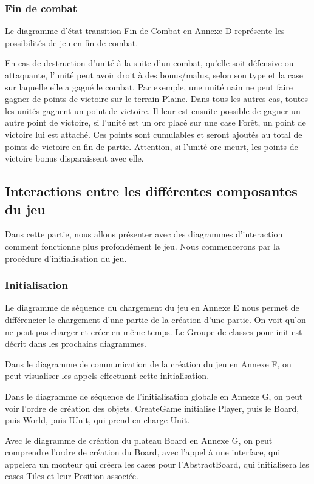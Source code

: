 \subsubsection{Fin de combat}

Le diagramme d'état transition Fin de Combat en Annexe D représente les possibilités de jeu en fin de combat. 

En cas de destruction d'unité à la suite d'un combat, qu'elle soit défensive ou attaquante, l'unité peut avoir droit à des bonus/malus, selon son type et la case sur laquelle elle a gagné le combat. Par exemple, une unité nain ne peut faire gagner de points de victoire sur le terrain Plaine. Dans tous les autres cas, toutes les unités gagnent un point de victoire. Il leur est ensuite possible de gagner un autre point de victoire, si l'unité est un orc placé sur une case Forêt, un point de victoire lui est attaché. Ces points sont cumulables et seront ajoutés au total de points de victoire en fin de partie. Attention, si l'unité orc meurt, les points de victoire bonus disparaissent avec elle.

\subsection{Interactions entre les différentes composantes du jeu}

Dans cette partie, nous allons présenter avec des diagrammes d'interaction comment fonctionne plus profondément le jeu. Nous commencerons par la procédure d'initialisation du jeu.
\subsubsection{Initialisation}

Le diagramme de séquence du chargement du jeu en Annexe E nous permet de différencier le chargement d'une partie de la création d'une partie. On voit qu'on ne peut pas charger et créer en même temps. Le Groupe de classes pour init est décrit dans les prochains diagrammes.

Dans le diagramme de communication de la création du jeu en Annexe F, on peut visualiser les appels effectuant cette initialisation.

Dans le diagramme de séquence de l'initialisation globale en Annexe G, on peut voir l'ordre de création des objets. CreateGame initialise Player, puis le Board, puis World, puis IUnit, qui prend en charge Unit.

Avec le diagramme de création du plateau Board en Annexe G, on peut comprendre l'ordre de création du Board, avec l'appel à une interface, qui appelera un monteur qui créera les cases pour l'AbstractBoard, qui initialisera les cases Tiles et leur Position associée.

